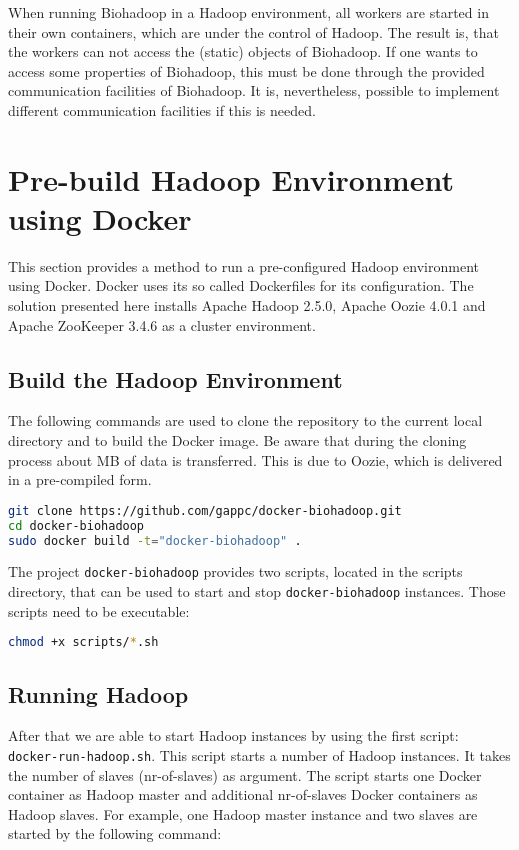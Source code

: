When running Biohadoop in a Hadoop environment, all workers are started in their own containers, which are under the control of Hadoop. The result is, that the workers can not access the (static) objects of Biohadoop. If one wants to access some properties of Biohadoop, this must be done through the provided communication facilities of Biohadoop. It is, nevertheless, possible to implement different communication facilities if this is needed.

\section{Pre-build Hadoop Environment using Docker}
\label{chap:appendix:biohadoop-docker}
This section provides a method to run a pre-configured Hadoop environment using Docker. Docker uses its so called Dockerfiles for its configuration. The solution presented here installs Apache Hadoop 2.5.0, Apache Oozie 4.0.1 and Apache ZooKeeper 3.4.6 as a cluster environment.

\subsection{Build the Hadoop Environment}
The following commands are used to clone the repository to the current local directory and to build the Docker image. Be aware that during the cloning process about \unit[400]{MB} of data is transferred. This is due to Oozie, which is delivered in a pre-compiled form.
\begin{lstlisting}[language=bash]
git clone https://github.com/gappc/docker-biohadoop.git
cd docker-biohadoop
sudo docker build -t="docker-biohadoop" .
\end{lstlisting}

The project \texttt{docker-biohadoop} provides two scripts, located in the scripts directory, that can be used to start and stop \texttt{docker-biohadoop} instances. Those scripts need to be executable:

\begin{lstlisting}[language=bash]
chmod +x scripts/*.sh
\end{lstlisting}

\subsection{Running Hadoop}
After that we are able to start Hadoop instances by using the first script: \texttt{docker-run-hadoop.sh}. This script starts a number of Hadoop instances. It takes the number of slaves (nr-of-slaves) as argument. The script starts one Docker container as Hadoop master and additional nr-of-slaves Docker containers as Hadoop slaves. For example, one Hadoop master instance and two slaves are started by the following command:

